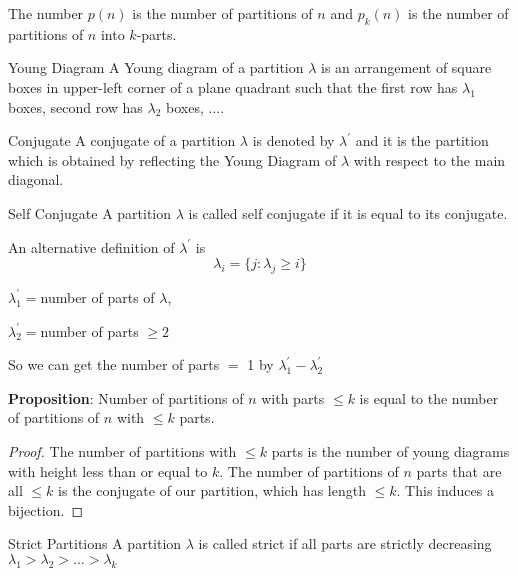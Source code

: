 \documentclass{report}
\begin{document}
The number $p(n)$ is the number of partitions of $n$ and $p_{k}(n)$ is the number of partitions of $n$ into $k$-parts.

\begin{definition}{Young Diagram}
    A Young diagram of a partition $\lambda$ is an arrangement of square boxes in upper-left corner of a plane quadrant such that the first row has $\lambda_{1}$ boxes, second row has $\lambda_{2}$ boxes, $\ldots $.
\end{definition}

\begin{definition}{Conjugate}
    A conjugate of a partition $\lambda$ is denoted by $\lambda^{\prime}$ and it is the partition which is obtained by reflecting the Young Diagram of $\lambda$ with respect to the main diagonal.
\end{definition}

\begin{definition}{Self Conjugate}
    A partition $\lambda$ is called self conjugate if it is equal to its conjugate.
\end{definition}

An alternative definition of $\lambda^{\prime}$ is 
    \begin{equation*}
        \lambda_{i} = \{j : \lambda_{j} \geq i\}
    \end{equation*}
\begin{examples}
    \begin{example}
        $\lambda_{1}^{\prime} = $number of parts of $\lambda$,

        $\lambda_{2}^{\prime} = $number of parts $\geq  2$

        So we can get the number of parts $=$ 1 by $\lambda_{1}^{\prime} - \lambda_{2}^{\prime}$
    \end{example}
\end{examples}

\textbf{Proposition}: Number of partitions of $n$ with parts $\leq k$ is equal to the number of partitions of $n$ with $\leq k$ parts.
    \begin{proof}
        The number of partitions with $\leq k$ parts is the number of young diagrams with height less than or equal to $k$. The number of partitions of $n$ parts that are all $\leq k$ is the conjugate of our partition, which has length $\leq k$. This induces a bijection.
    \end{proof}

\begin{definition}{Strict Partitions}
    A partition $\lambda$ is called strict if all parts are strictly decreasing $\lambda_{1} > \lambda_{2} > \ldots >  \lambda_{k}$
\end{definition}
\end{document}
